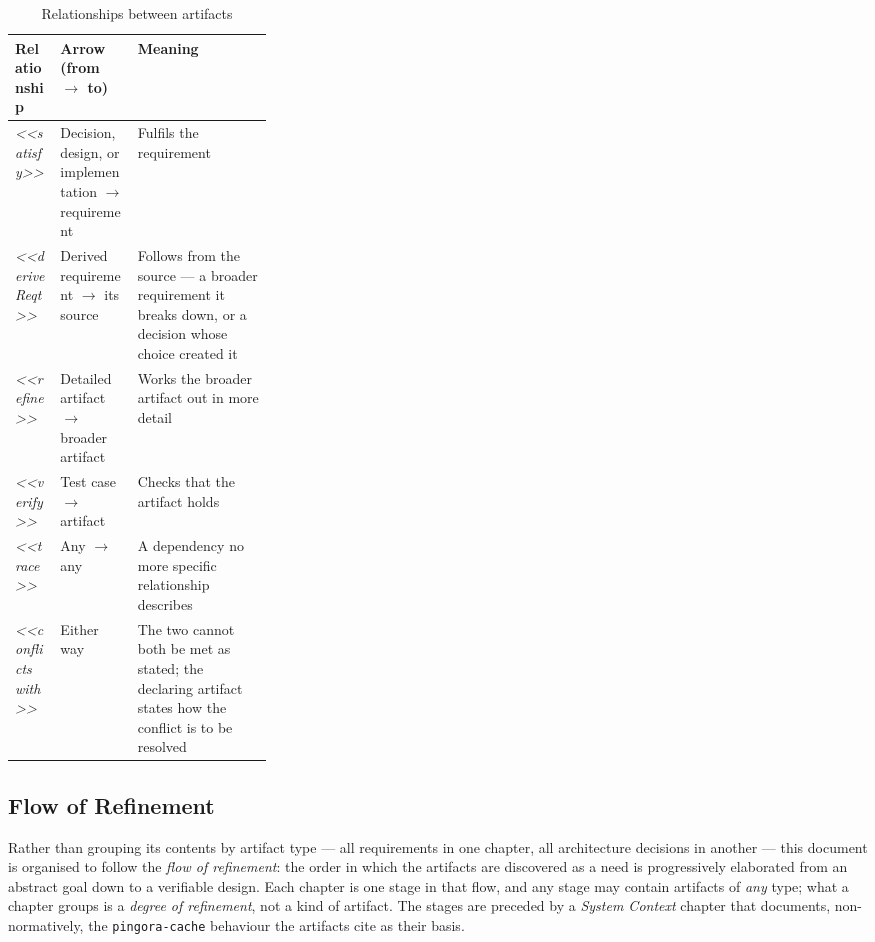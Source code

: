 \begin{table}[tb]
\centering\small\renewcommand{\arraystretch}{1.3}%
\caption{Relationships between artifacts}\label{tab:sysml-relationship-types}
\begin{tabularx}{\linewidth}{|l|>{\raggedright\arraybackslash}p{0.3\linewidth}|X|}
\hline
\textbf{Relationship} & \textbf{Arrow (from $\rightarrow$ to)} & \textbf{Meaning} \\
\hline
\textit{<<satisfy>>} & Decision, design, or implementation $\rightarrow$ requirement & Fulfils the requirement \\
\hline
\textit{<<deriveReqt>>} & Derived requirement $\rightarrow$ its source & Follows from the source --- a broader requirement it breaks down, or a decision whose choice created it \\
\hline
\textit{<<refine>>} & Detailed artifact $\rightarrow$ broader artifact & Works the broader artifact out in more detail \\
\hline
\textit{<<verify>>} & Test case $\rightarrow$ artifact & Checks that the artifact holds \\
\hline
\textit{<<trace>>} & Any $\rightarrow$ any & A dependency no more specific relationship describes \\
\hline
\textit{<<conflicts with>>} & Either way & The two cannot both be met as stated; the declaring artifact states how the conflict is to be resolved \\
\hline
\end{tabularx}
\end{table}

\subsection*{Flow of Refinement}

Rather than grouping its contents by artifact type --- all requirements in one
chapter, all architecture decisions in another --- this document is organised to
follow the \emph{flow of refinement}: the order in which the artifacts are
discovered as a need is progressively elaborated from an abstract goal down to a
verifiable design. Each chapter is one stage in that flow, and any stage may
contain artifacts of \emph{any} type; what a chapter groups is a \emph{degree of
refinement}, not a kind of artifact. The stages are preceded by a \emph{System
Context} chapter that documents, non-normatively, the \texttt{pingora-cache}
behaviour the artifacts cite as their basis.

